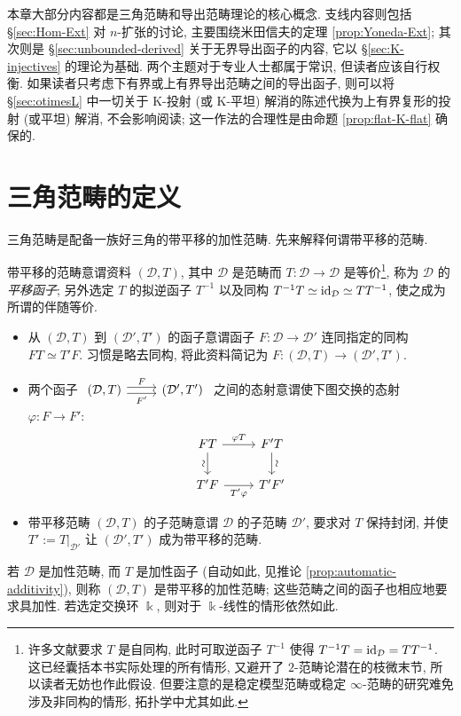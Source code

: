 \begin{wenxintishi}
	本章大部分内容都是三角范畴和导出范畴理论的核心概念. 支线内容则包括 \S\ref{sec:Hom-Ext} 对 $n$-扩张的讨论, 主要围绕米田信夫的定理 \ref{prop:Yoneda-Ext}; 其次则是 \S\ref{sec:unbounded-derived} 关于无界导出函子的内容, 它以 \S\ref{sec:K-injectives} 的理论为基础. 两个主题对于专业人士都属于常识, 但读者应该自行权衡. 如果读者只考虑下有界或上有界导出范畴之间的导出函子, 则可以将 \S\ref{sec:otimesL} 中一切关于 K-投射 (或 K-平坦) 解消的陈述代换为上有界复形的投射 (或平坦) 解消, 不会影响阅读; 这一作法的合理性是由命题 \ref{prop:flat-K-flat} 确保的.
\end{wenxintishi}

\section{三角范畴的定义}\label{sec:triangular-def}

三角范畴是配备一族好三角的带平移的加性范畴. 先来解释何谓带平移的范畴.

\begin{definition}\label{def:category-with-translation}
	带平移的范畴意谓资料 $(\mathcal{D}, T)$, 其中 $\mathcal{D}$ 是范畴而 $T: \mathcal{D} \to \mathcal{D}$ 是等价\footnote{许多文献要求 $T$ 是自同构, 此时可取逆函子 $T^{-1}$ 使得 $T^{-1} T = \mathrm{id}_{\mathcal{D}} = TT^{-1}$. 这已经囊括本书实际处理的所有情形, 又避开了 $2$-范畴论潜在的枝微末节, 所以读者无妨也作此假设. 但要注意的是稳定模型范畴或稳定 $\infty$-范畴的研究难免涉及非同构的情形, 拓扑学中尤其如此.}, 称为 $\mathcal{D}$ 的\emph{平移函子}; 另外选定 $T$ 的拟逆函子 $T^{-1}$ 以及同构 $T^{-1} T \simeq \mathrm{id}_{\mathcal{D}} \simeq TT^{-1}$, 使之成为 \cite[定理 2.6.12]{Li1} 所谓的伴随等价.
	\begin{itemize}
		\item 从 $(\mathcal{D}, T)$ 到 $(\mathcal{D}', T')$ 的函子意谓函子 $F: \mathcal{D} \to \mathcal{D}'$ 连同指定的同构 $FT \simeq T' F$. 习惯是略去同构, 将此资料简记为 $F: (\mathcal{D}, T) \to (\mathcal{D}', T')$.
		\item 两个函子 $\begin{tikzcd}
			(\mathcal{D}, T) \arrow[r, shift left, "F"] \arrow[r, shift right, "{F'}"'] & (\mathcal{D}', T')
		\end{tikzcd}$
		之间的态射意谓使下图交换的态射 $\varphi: F \to F'$:
		\[\begin{tikzcd}
			FT \arrow[r, "\varphi T"] \arrow[d, "\sim"' sloped] & F'T \arrow[d, "\sim" sloped] \\
			T' F \arrow[r, "{T' \varphi}"'] & T' F' 
		\end{tikzcd}\]
		\item 带平移范畴 $(\mathcal{D}, T)$ 的子范畴意谓 $\mathcal{D}$ 的子范畴 $\mathcal{D}'$, 要求对 $T$ 保持封闭, 并使 $T' := T|_{\mathcal{D}'}$ 让 $(\mathcal{D}', T')$ 成为带平移的范畴.
	\end{itemize}

	若 $\mathcal{D}$ 是加性范畴, 而 $T$ 是加性函子 (自动如此, 见推论 \ref{prop:automatic-additivity}), 则称 $(\mathcal{D}, T)$ 是带平移的加性范畴; 这些范畴之间的函子也相应地要求具加性. 若选定交换环 $\Bbbk$, 则对于 $\Bbbk$-线性的情形依然如此.
\end{definition}

